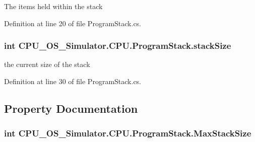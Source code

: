 The items held within the stack 



Definition at line 20 of file Program\+Stack.\+cs.

\hypertarget{class_c_p_u___o_s___simulator_1_1_c_p_u_1_1_program_stack_ab0667a30e4d6e10c3ffddfdfbc084102}{}
\subsubsection[{stack\+Size}]{\setlength{\rightskip}{0pt plus 5cm}int C\+P\+U\+\_\+\+O\+S\+\_\+\+Simulator.\+C\+P\+U.\+Program\+Stack.\+stack\+Size\hspace{0.3cm}{\ttfamily [private]}}\label{class_c_p_u___o_s___simulator_1_1_c_p_u_1_1_program_stack_ab0667a30e4d6e10c3ffddfdfbc084102}


the current size of the stack 



Definition at line 30 of file Program\+Stack.\+cs.



\subsection{Property Documentation}
\hypertarget{class_c_p_u___o_s___simulator_1_1_c_p_u_1_1_program_stack_a5ed770e83658cfcde6e451c27342dca3}{}
\subsubsection[{Max\+Stack\+Size}]{\setlength{\rightskip}{0pt plus 5cm}int C\+P\+U\+\_\+\+O\+S\+\_\+\+Simulator.\+C\+P\+U.\+Program\+Stack.\+Max\+Stack\+Size\hspace{0.3cm}{\ttfamily [get]}}\label{class_c_p_u___o_s___simulator_1_1_c_p_u_1_1_program_stack_a5ed770e83658cfcde6e451c27342dca3}


